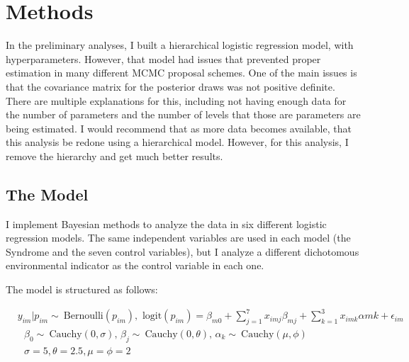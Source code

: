 \documentclass[letterpaper,10.5pt]{article}
\begin{document}
\section{Methods}

In the preliminary analyses, I built a hierarchical logistic regression model, with hyperparameters. However, that model had issues that prevented proper estimation in many different MCMC proposal schemes. One of the main issues is that the covariance matrix for the posterior draws was not positive definite. There are multiple explanations for this, including not having enough data for the number of parameters and the number of levels that those are parameters are being estimated. I would recommend that as more data becomes available, that this analysis be redone using a hierarchical model. However, for this analysis, I remove the hierarchy and get much better results.

\subsection{The Model}

I implement Bayesian methods to analyze the data in six different logistic regression models. The same independent variables are used in each model (the Syndrome and the seven control variables), but I analyze a different dichotomous environmental indicator as the control variable in each one.

The model is structured as follows:

\begin{equation}
\begin{split}
&y_{im}|p_{im} \sim\ \text{Bernoulli}(p_{im}), \text{  logit}(p_{im}) = \beta_{m0} + \sum_{j=1}^{7} x_{imj} \beta_{mj} + \sum_{k=1}^{3} x_{imk} \alpha{mk} + \epsilon_{im} \\
&\text{    } \beta_0 \sim\ \text{Cauchy}(0,\sigma) \text{, } \beta_{j} \sim\ \text{Cauchy}(0,\theta) \text{, } \alpha_k \sim\ \text{Cauchy}(\mu,\phi) \\
&\text{   } \sigma=5, \theta=2.5, \mu=\phi=2
\end{split}
\end{equation}
\end{document}
